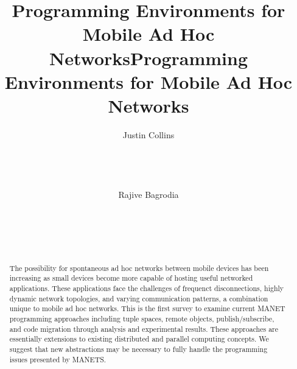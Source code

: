 \documentclass{sig-alternate}
\begin{document}
\title{Programming Environments for Mobile Ad Hoc Networks}

\begin{comment}
\conferenceinfo{WICON '08}{November 17-19, 2008, Maui, Hawaii, USA}
\end{comment}

\title{Programming Environments for Mobile Ad Hoc Networks}

\author{
\alignauthor
Justin Collins\\
       \\
       \\
       \\
       \\
\alignauthor
Rajive Bagrodia\\
       \\
       \\
       \\
       \\
}


\maketitle
\begin{abstract}
The possibility for spontaneous ad hoc networks between mobile devices has been increasing as small devices become more capable of hosting useful networked applications. These applications face the challenges of frequenct disconnections, highly dynamic network topologies, and varying communication patterns, a combination unique to mobile ad hoc networks. This is the first survey to examine current MANET programming approaches including tuple spaces, remote objects, publish/subscribe, and code migration through analysis and experimental results. These approaches are essentially extensions to existing distributed and parallel computing concepts. We suggest that new abstractions may be necessary to fully handle the programming issues presented by MANETS.

\end{abstract}
\end{document}

